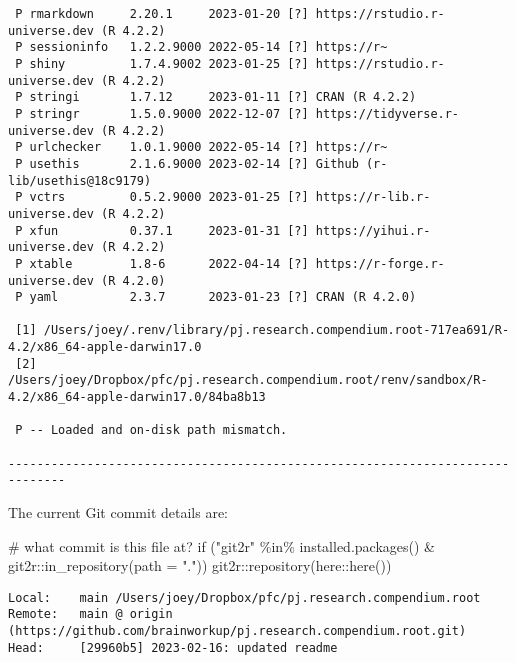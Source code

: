 \documentclass[
  super,
  preprint,
  3p]{elsarticle}
\newenvironment{Shaded}{\begin{snugshade}}{\end{snugshade}}
\newcommand{\AttributeTok}[1]{\textcolor[rgb]{0.40,0.45,0.13}{#1}}
\newcommand{\CommentTok}[1]{\textcolor[rgb]{0.37,0.37,0.37}{#1}}
\newcommand{\ControlFlowTok}[1]{\textcolor[rgb]{0.00,0.23,0.31}{#1}}
\newcommand{\FunctionTok}[1]{\textcolor[rgb]{0.28,0.35,0.67}{#1}}
\newcommand{\NormalTok}[1]{\textcolor[rgb]{0.00,0.23,0.31}{#1}}
\newcommand{\SpecialCharTok}[1]{\textcolor[rgb]{0.37,0.37,0.37}{#1}}
\newcommand{\StringTok}[1]{\textcolor[rgb]{0.13,0.47,0.30}{#1}}
\begin{document}
\begin{verbatim}
 P rmarkdown     2.20.1     2023-01-20 [?] https://rstudio.r-universe.dev (R 4.2.2)
 P sessioninfo   1.2.2.9000 2022-05-14 [?] https://r~
 P shiny         1.7.4.9002 2023-01-25 [?] https://rstudio.r-universe.dev (R 4.2.2)
 P stringi       1.7.12     2023-01-11 [?] CRAN (R 4.2.2)
 P stringr       1.5.0.9000 2022-12-07 [?] https://tidyverse.r-universe.dev (R 4.2.2)
 P urlchecker    1.0.1.9000 2022-05-14 [?] https://r~
 P usethis       2.1.6.9000 2023-02-14 [?] Github (r-lib/usethis@18c9179)
 P vctrs         0.5.2.9000 2023-01-25 [?] https://r-lib.r-universe.dev (R 4.2.2)
 P xfun          0.37.1     2023-01-31 [?] https://yihui.r-universe.dev (R 4.2.2)
 P xtable        1.8-6      2022-04-14 [?] https://r-forge.r-universe.dev (R 4.2.0)
 P yaml          2.3.7      2023-01-23 [?] CRAN (R 4.2.0)

 [1] /Users/joey/.renv/library/pj.research.compendium.root-717ea691/R-4.2/x86_64-apple-darwin17.0
 [2] /Users/joey/Dropbox/pfc/pj.research.compendium.root/renv/sandbox/R-4.2/x86_64-apple-darwin17.0/84ba8b13

 P -- Loaded and on-disk path mismatch.

------------------------------------------------------------------------------
\end{verbatim}

The current Git commit details are:

\begin{Shaded}
\begin{Highlighting}[]
\CommentTok{\# what commit is this file at? }
\ControlFlowTok{if}\NormalTok{ (}\StringTok{"git2r"} \SpecialCharTok{\%in\%} \FunctionTok{installed.packages}\NormalTok{() }\SpecialCharTok{\&}\NormalTok{ git2r}\SpecialCharTok{::}\FunctionTok{in\_repository}\NormalTok{(}\AttributeTok{path =} \StringTok{"."}\NormalTok{)) git2r}\SpecialCharTok{::}\FunctionTok{repository}\NormalTok{(here}\SpecialCharTok{::}\FunctionTok{here}\NormalTok{())  }
\end{Highlighting}
\end{Shaded}

\begin{verbatim}
Local:    main /Users/joey/Dropbox/pfc/pj.research.compendium.root
Remote:   main @ origin (https://github.com/brainworkup/pj.research.compendium.root.git)
Head:     [29960b5] 2023-02-16: updated readme
\end{verbatim}


  
\end{document}
